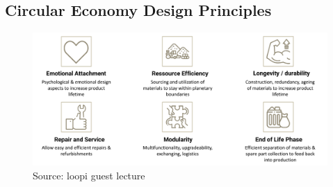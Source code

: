 \documentclass[11pt]{article}
\theoremstyle{definition}
\begin{document}
\subsection{Circular Economy Design Principles}
\begin{figure}[H]
	\centering
	\includegraphics[width=0.8\linewidth]{img/circular_economy_design_principles}
	\caption{Source: loopi guest lecture}
	\label{fig:circulareconomydesignprinciples}
\end{figure}
\end{document}
